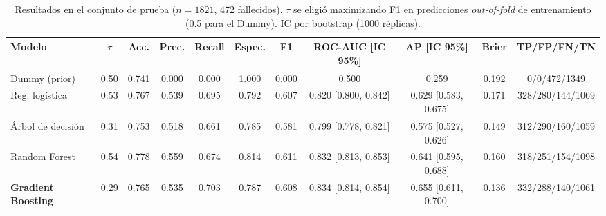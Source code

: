 \begin{table}[!tp]
\centering
\scriptsize
\caption{Resultados en el conjunto de prueba ($n=1821$, 472 fallecidos). $\tau$ se eligió maximizando F1 en predicciones \textit{out-of-fold} de entrenamiento (0.5 para el Dummy). IC por bootstrap (1000 réplicas).}
\label{tab:test}
\setlength{\tabcolsep}{4pt}
\begin{tabular}{lcccccccccc}
\toprule
Modelo & $\tau$ & Acc. & Prec. & Recall & Espec. & F1 & ROC-AUC [IC 95\%] & AP [IC 95\%] & Brier & TP/FP/FN/TN \\
\midrule
Dummy (prior) & 0.50 & 0.741 & 0.000 & 0.000 & 1.000 & 0.000 & 0.500 & 0.259 & 0.192 & 0/0/472/1349 \\
Reg. logística & 0.53 & 0.767 & 0.539 & 0.695 & 0.792 & 0.607 & 0.820 [0.800, 0.842] & 0.629 [0.583, 0.675] & 0.171 & 328/280/144/1069 \\
Árbol de decisión & 0.31 & 0.753 & 0.518 & 0.661 & 0.785 & 0.581 & 0.799 [0.778, 0.821] & 0.575 [0.527, 0.626] & 0.149 & 312/290/160/1059 \\
Random Forest & 0.54 & 0.778 & 0.559 & 0.674 & 0.814 & 0.611 & 0.832 [0.813, 0.853] & 0.641 [0.595, 0.688] & 0.160 & 318/251/154/1098 \\
\textbf{Gradient Boosting} & 0.29 & 0.765 & 0.535 & 0.703 & 0.787 & 0.608 & 0.834 [0.814, 0.854] & 0.655 [0.611, 0.700] & 0.136 & 332/288/140/1061 \\
\bottomrule
\end{tabular}
\end{table}
